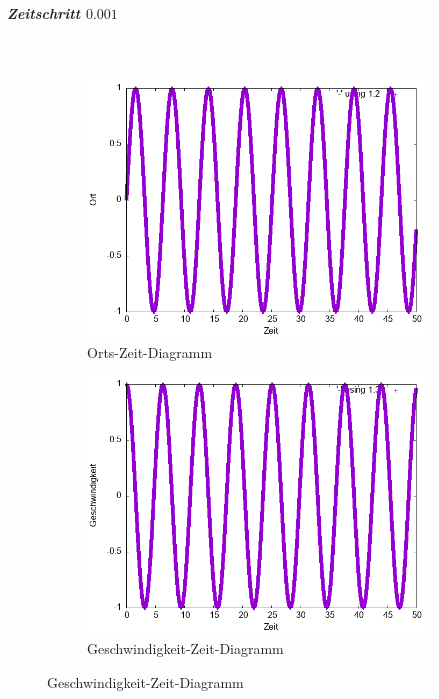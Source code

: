 \documentclass[
    oneside,
    ngerman,
    footinclude=false,
    captions=tableheading,
    DIV=12
]{scrartcl}
\begin{document}
                \subparagraph*{Zeitschritt $0.001$}\,
                \begin{figure}[H]
                    \centering
                    \begin{subfigure}[b]{0.45\textwidth}
                        \centering
                        \includegraphics[width=\textwidth]{Bilddateien/expEulerA1(a)-0001-0-x.png}
                        \caption{Orts-Zeit-Diagramm}
                        \label{fig:expEulerA1(a)-0001-0-x}
                    \end{subfigure}
                    \hfill
                    \begin{subfigure}[b]{0.45\textwidth}
                        \centering
                        \includegraphics[width=\textwidth]{Bilddateien/expEulerA1(a)-0001-0-v.png}
                        \caption{Geschwindigkeit-Zeit-Diagramm}
                        \label{fig:expEulerA1(a)-0001-0-v}
                    \end{subfigure}
                \end{figure}
                
\end{document}
